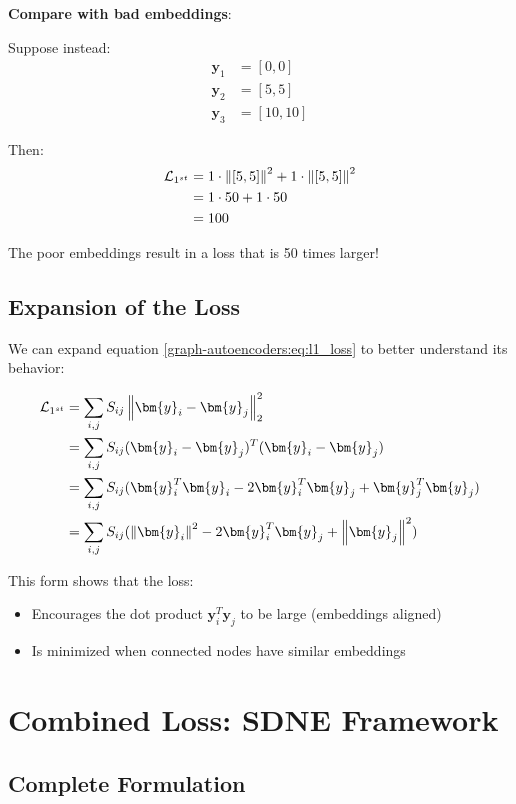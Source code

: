 \begin{notechapter}
\begin{example}
\textbf{Compare with bad embeddings}:

Suppose instead:
\begin{align*}
\bm{y}_1 &= [0, 0] \\
\bm{y}_2 &= [5, 5] \\
\bm{y}_3 &= [10, 10]
\end{align*}

Then:
\begin{align*}
\mathcal{L}_{1^{st}} &= 1 \cdot \left\|[5,5]\right\|^2 + 1 \cdot \left\|[5,5]\right\|^2 \\
&= 1 \cdot 50 + 1 \cdot 50 \\
&= 100
\end{align*}

The poor embeddings result in a loss that is 50 times larger!
\end{example}

\subsection{Expansion of the Loss}

We can expand equation \eqref{graph-autoencoders:eq:l1_loss} to better understand its behavior:

\begin{align}
\mathcal{L}_{1^{st}} &= \sum_{i,j} S_{ij} \norm{\bm{y}_i - \bm{y}_j}^2_2 \nonumber \\
&= \sum_{i,j} S_{ij} (\bm{y}_i - \bm{y}_j)^T(\bm{y}_i - \bm{y}_j) \nonumber \\
&= \sum_{i,j} S_{ij} (\bm{y}_i^T\bm{y}_i - 2\bm{y}_i^T\bm{y}_j + \bm{y}_j^T\bm{y}_j) \nonumber \\
&= \sum_{i,j} S_{ij} (\norm{\bm{y}_i}^2 - 2\bm{y}_i^T\bm{y}_j + \norm{\bm{y}_j}^2)
\label{graph-autoencoders:eq:l1_expanded}
\end{align}

This form shows that the loss:
\begin{itemize}
    \item Encourages the dot product $\bm{y}_i^T\bm{y}_j$ to be large (embeddings aligned)
    \item Is minimized when connected nodes have similar embeddings
\end{itemize}

\section{Combined Loss: SDNE Framework}

\subsection{Complete Formulation}


\end{notechapter}
